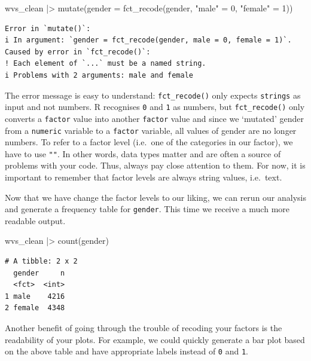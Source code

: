 \documentclass[
  letterpaper,
]{krantz}
\makeatletter
\newenvironment{Shaded}{\begin{snugshade}}{\end{snugshade}}
\newcommand{\AttributeTok}[1]{\textcolor[rgb]{0.40,0.45,0.13}{#1}}
\newcommand{\DecValTok}[1]{\textcolor[rgb]{0.68,0.00,0.00}{#1}}
\newcommand{\FunctionTok}[1]{\textcolor[rgb]{0.28,0.35,0.67}{#1}}
\newcommand{\NormalTok}[1]{\textcolor[rgb]{0.00,0.23,0.31}{#1}}
\newcommand{\OtherTok}[1]{\textcolor[rgb]{0.00,0.23,0.31}{#1}}
\newcommand{\SpecialCharTok}[1]{\textcolor[rgb]{0.37,0.37,0.37}{#1}}
\newcommand{\StringTok}[1]{\textcolor[rgb]{0.13,0.47,0.30}{#1}}
\newenvironment{kframe}{%
\medskip{}
\setlength{\fboxsep}{.8em}
 \def\at@end@of@kframe{}%
 \ifinner\ifhmode%
  \def\at@end@of@kframe{\end{minipage}}%
  \begin{minipage}{\columnwidth}%
 \fi\fi%
 \def\FrameCommand##1{\hskip\@totalleftmargin \hskip-\fboxsep
 \colorbox{shadecolor}{##1}\hskip-\fboxsep
     \hskip-\linewidth \hskip-\@totalleftmargin \hskip\columnwidth}%
 \MakeFramed {\advance\hsize-\width
   \@totalleftmargin\z@ \linewidth\hsize
   \@setminipage}}%
 {\par\unskip\endMakeFramed%
 \at@end@of@kframe}
\renewenvironment{Shaded}{\begin{kframe}}{\end{kframe}}
\makeatother
\begin{document}
\begin{Shaded}
\begin{Highlighting}[]
\NormalTok{wvs\_clean }\SpecialCharTok{|\textgreater{}}
  \FunctionTok{mutate}\NormalTok{(}\AttributeTok{gender =} \FunctionTok{fct\_recode}\NormalTok{(gender,}
                             \StringTok{"male"} \OtherTok{=} \DecValTok{0}\NormalTok{,}
                             \StringTok{"female"} \OtherTok{=} \DecValTok{1}\NormalTok{))}
\end{Highlighting}
\end{Shaded}

\begin{verbatim}
Error in `mutate()`:
i In argument: `gender = fct_recode(gender, male = 0, female = 1)`.
Caused by error in `fct_recode()`:
! Each element of `...` must be a named string.
i Problems with 2 arguments: male and female
\end{verbatim}

The error message is easy to understand: \texttt{fct\_recode()} only
expects \texttt{strings} as input and not numbers. R recognises
\texttt{0} and \texttt{1} as numbers, but \texttt{fct\_recode()} only
converts a \texttt{factor} value into another \texttt{factor} value and
since we `mutated' gender from a \texttt{numeric} variable to a
\texttt{factor} variable, all values of gender are no longer numbers. To
refer to a factor level (i.e.~one of the categories in our factor), we
have to use \texttt{""}. In other words, data types matter and are often
a source of problems with your code. Thus, always pay close attention to
them. For now, it is important to remember that factor levels are always
string values, i.e.~text.

Now that we have change the factor levels to our liking, we can rerun
our analysis and generate a frequency table for \texttt{gender}. This
time we receive a much more readable output.

\begin{Shaded}
\begin{Highlighting}[]
\NormalTok{wvs\_clean }\SpecialCharTok{|\textgreater{}} \FunctionTok{count}\NormalTok{(gender)}
\end{Highlighting}
\end{Shaded}

\begin{verbatim}
# A tibble: 2 x 2
  gender     n
  <fct>  <int>
1 male    4216
2 female  4348
\end{verbatim}

Another benefit of going through the trouble of recoding your factors is
the readability of your plots. For example, we could quickly generate a
bar plot based on the above table and have appropriate labels instead of
\texttt{0} and \texttt{1}.
\end{document}
